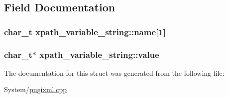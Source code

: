 \subsection{Field Documentation}
\hypertarget{structxpath__variable__string_a5c43cdcc55a620db0e7bdd29b4d56e89}{
\subsubsection[{name}]{\setlength{\rightskip}{0pt plus 5cm}char\-\_\-t xpath\-\_\-variable\-\_\-string\-::name\mbox{[}1\mbox{]}}}\label{structxpath__variable__string_a5c43cdcc55a620db0e7bdd29b4d56e89}
\hypertarget{structxpath__variable__string_aeb8a87a8457d2615cd7b766fd3f30559}{
\subsubsection[{value}]{\setlength{\rightskip}{0pt plus 5cm}char\-\_\-t$\ast$ xpath\-\_\-variable\-\_\-string\-::value}}\label{structxpath__variable__string_aeb8a87a8457d2615cd7b766fd3f30559}


The documentation for this struct was generated from the following file\-:\begin{DoxyCompactItemize}
\item 
System/\hyperlink{pugixml_8cpp}{pugixml.\-cpp}\end{DoxyCompactItemize}
